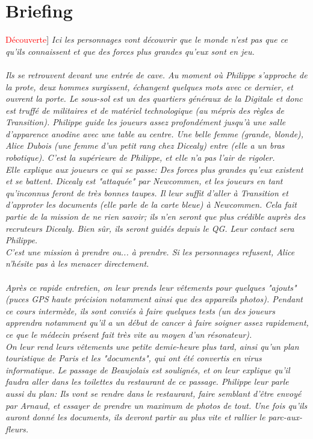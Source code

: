 \documentclass[10pt,a4paper,twocolumn]{article}
\newenvironment{lAbstract}[1]{{[}\textcolor{red}{#1}{]}\itshape}{\\ \\}
\begin{document}
\section{Briefing}
\begin{lAbstract}{Découverte}
Ici les personnages vont découvrir que le monde n'est pas que ce qu'ils connaissent et que des forces plus grandes qu'eux sont en jeu.
\end{lAbstract}
Ils se retrouvent devant une entrée de cave. Au moment où Philippe s'approche de la prote, deux hommes surgissent, échangent quelques mots avec ce dernier, et ouvrent la porte. Le sous-sol est un des quartiers généraux de la Digitale et donc est truffé de militaires et de matériel technologique (au mépris des règles de Transition). Philippe guide les joueurs assez profondément jusqu'à une salle d'apparence anodine avec une table au centre. Une belle femme (grande, blonde), Alice Dubois (une femme d'un petit rang chez Dicealy) entre (elle a un bras robotique). C'est la supérieure de Philippe, et elle n'a pas l'air de rigoler.\\
Elle explique aux joueurs ce qui se passe: Des forces plus grandes qu'eux existent et se battent. Dicealy est "attaquée" par Newcommen, et les joueurs en tant qu'inconnus feront de très bonnes taupes. Il leur suffit d'aller à Transition et d'approter les documents (elle parle de la carte bleue) à Newcommen. Cela fait partie de la mission de ne rien savoir; ils n'en seront que plus crédible auprès des recruteurs Dicealy. Bien sûr, ils seront guidés depuis le QG. Leur contact sera Philippe.\\
C'est une mission à prendre ou... à prendre. Si les personnages refusent, Alice n'hésite pas à les menacer directement.
\\
\\
Après ce rapide entretien, on leur prends leur vêtements pour quelques "ajouts" (puces GPS haute précision notamment ainsi que des appareils photos). Pendant ce cours intermède, ils sont conviés à faire quelques tests (un des joueurs apprendra notamment qu'il a un début de cancer à faire soigner assez rapidement, ce que le médecin présent fait très vite au moyen d'un résonateur).
\\
On leur rend leurs vêtements une petite demie-heure plus tard, ainsi qu'un plan touristique de Paris et les "documents", qui ont été convertis en virus informatique. Le passage de Beaujolais est soulignés, et on leur explique qu'il faudra aller dans les toilettes du restaurant de ce passage.
Philippe leur parle aussi du plan: Ils vont se rendre dans le restaurant, faire semblant d'être envoyé par Arnaud, et essayer de prendre un maximum de photos de tout. Une fois qu'ils auront donné les documents, ils devront partir au plus vite et rallier le parc-aux-fleurs. 
\end{document}
